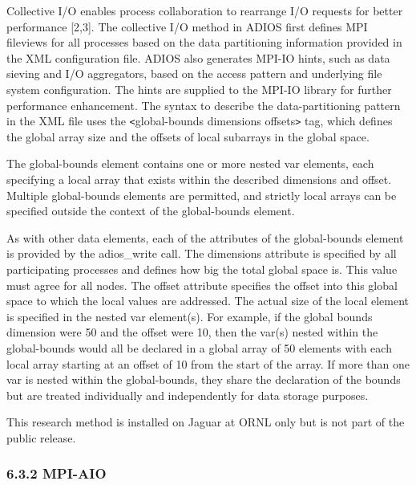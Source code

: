 \vspace{10pt}
Collective I/O enables process collaboration to rearrange I/O requests for better 
performance [2,3]. The collective I/O method in ADIOS first defines MPI fileviews 
for all processes based on the data partitioning information provided in the XML 
configuration file. ADIOS also generates MPI-IO hints, such as data sieving and 
I/O aggregators, based on the access pattern and underlying file system configuration. 
The hints are supplied to the MPI-IO library for further performance enhancement. 
The syntax to describe the data-partitioning pattern in the XML file uses the \texttt{<}global-bounds 
dimensions offsets\texttt{>} tag, which defines the global array size and the offsets 
of local subarrays in the global space. 

\vspace{10pt}
The global-bounds element contains one or more nested var elements, each specifying 
a local array that exists within the described dimensions and offset.  Multiple 
global-bounds elements are permitted, and strictly local arrays can be specified 
outside the context of the global-bounds element.

\vspace{10pt}
As with other data elements, each of the attributes of the global-bounds element 
is provided by the adios\_write call. The dimensions attribute is specified by 
all participating processes and defines how big the total global space is.  This 
value must agree for all nodes. The offset attribute specifies the offset into 
this global space to which the local values are addressed. The actual size of the 
local element is specified in the nested var element(s).  For example, if the global 
bounds dimension were 50 and the offset were 10, then the var(s) nested within 
the global-bounds would all be declared in a global array of 50 elements with each 
local array starting at an offset of 10 from the start of the array.  If more than 
one var is nested within the global-bounds, they share the declaration of the bounds 
but are treated individually and independently for data storage purposes. 

\vspace{10pt}
This research method is installed on Jaguar at ORNL only but is not part of the 
public release.\label{HToc182553395}

\vspace{10pt}
\subsubsection*{{\large \textbf{6.3.2 MPI-AIO}}}

